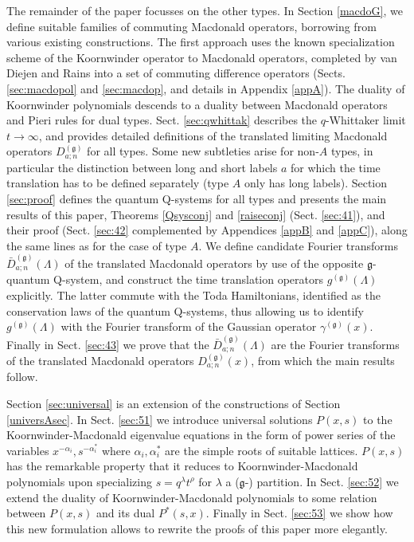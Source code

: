 \documentclass[12pt]{amsart}
\newcommand{\g}{{\mathfrak{g}}}
\newcommand{\al}{{\alpha}}
\newcommand{\lL}{{\Lambda}}
\numberwithin{equation}{section}
\begin{document}
The remainder of the paper focusses on the other types. In Section \ref{macdoG}, we define suitable families of commuting Macdonald operators, borrowing from various existing constructions. The first approach uses the known specialization scheme of the Koornwinder operator to Macdonald operators, completed by van Diejen and Rains into a set of commuting difference operators (Sects. \ref{sec:macdopol} and \ref{sec:macdop}, and details in Appendix \ref{appA}). The duality of Koornwinder polynomials descends to a duality between Macdonald operators and Pieri rules for dual types. Sect. \ref{sec:qwhittak} describes the $q$-Whittaker limit $t\to\infty$, and provides detailed definitions of the translated limiting Macdonald operators $D_{a;n}^{(\g)}$ for all types. Some new subtleties arise for non-$A$ types, in particular the distinction between 
long and short labels $a$ for which the time translation has to be defined separately (type $A$ only has long labels).
Section \ref{sec:proof} defines the quantum Q-systems for all types and presents the main results of this paper,
Theorems \ref{Qsysconj} and \ref{raiseconj} (Sect. \ref{sec:41}), and their proof (Sect. \ref{sec:42} complemented by Appendices \ref{appB} and \ref{appC}), along the same lines as for the case of type $A$. We define candidate Fourier transforms $\bar D_{a;n}^{(\g)}(\lL)$ of the translated Macdonald operators by use of the opposite $\g$-quantum Q-system, and construct the time translation operators  $g^{(\g)}(\lL)$ explicitly. The latter commute with the Toda Hamiltonians, identified as the conservation laws of the quantum Q-systems, thus allowing us to identify $g^{(\g)}(\lL)$ with the Fourier transform of the Gaussian operator $\gamma^{(\g)}(x)$. 
Finally in Sect. \ref{sec:43} we prove that the $\bar D_{a;n}^{(\g)}(\lL)$ are the Fourier transforms of the 
translated Macdonald operators $D_{a;n}^{(\g)}(x)$, from which the main results follow. 

Section \ref{sec:universal} is an extension of the constructions of Section \ref{universAsec}. 
In Sect. \ref{sec:51}
we introduce universal solutions $P(x,s)$ to the Koornwinder-Macdonald eigenvalue equations in the form of power series of  the variables $x^{-\al_i},s^{-\al_i^*}$ where $\al_i,\al_i^*$ are the simple roots of suitable lattices. $P(x,s)$ has the remarkable 
property that it reduces to Koornwinder-Macdonald polynomials upon specializing $s=q^\lambda t^\rho$ for $\lambda$ a
($\g$-) partition. In Sect. \ref{sec:52} we extend the duality of Koornwinder-Macdonald polynomials to some 
relation between $P(x,s)$ and its dual $P^*(s,x)$. Finally in Sect. \ref{sec:53} we show how this new formulation 
allows to rewrite the proofs of this paper more elegantly.
\end{document}
